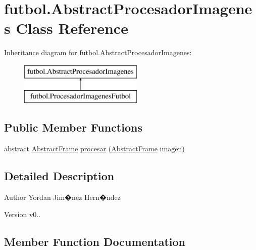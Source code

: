 \hypertarget{classfutbol_1_1_abstract_procesador_imagenes}{}\section{futbol.\+Abstract\+Procesador\+Imagenes Class Reference}
\label{classfutbol_1_1_abstract_procesador_imagenes}
Inheritance diagram for futbol.\+Abstract\+Procesador\+Imagenes\+:\begin{figure}[H]
\begin{center}
\leavevmode
\includegraphics[height=2.000000cm]{classfutbol_1_1_abstract_procesador_imagenes}
\end{center}
\end{figure}
\subsection*{Public Member Functions}
\begin{DoxyCompactItemize}
\item 
abstract \hyperlink{classfutbol_1_1_abstract_frame}{Abstract\+Frame} \hyperlink{classfutbol_1_1_abstract_procesador_imagenes_aecde69ab23aa8cd9ea912a6c37e913ff}{procesar} (\hyperlink{classfutbol_1_1_abstract_frame}{Abstract\+Frame} imagen)
\end{DoxyCompactItemize}


\subsection{Detailed Description}
\begin{DoxyAuthor}{Author}
Yordan Jim�nez Hern�ndez 
\end{DoxyAuthor}
\begin{DoxyVersion}{Version}
v0.. 
\end{DoxyVersion}


\subsection{Member Function Documentation}
\hypertarget{classfutbol_1_1_abstract_procesador_imagenes_aecde69ab23aa8cd9ea912a6c37e913ff}{}\label{classfutbol_1_1_abstract_procesador_imagenes_aecde69ab23aa8cd9ea912a6c37e913ff} 
